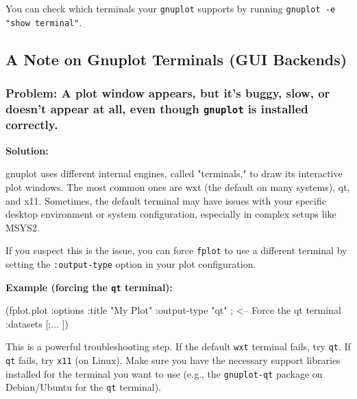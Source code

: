 \documentclass[12pt, letterpaper]{article}
\begin{document}
	You can check which terminals your \texttt{gnuplot} supports by running \texttt{gnuplot -e "show terminal"}.
	
	\subsection{A Note on Gnuplot Terminals (GUI Backends)}
	
	\subsubsection*{Problem: A plot window appears, but it's buggy, slow, or doesn't appear at all, even though \texttt{gnuplot} is installed correctly.}
	
	\textbf{Solution:}
	
	gnuplot uses different internal engines, called "terminals," to draw its interactive plot windows. The most common ones are wxt (the default on many systems), qt, and x11. Sometimes, the default terminal may have issues with your specific desktop environment or system configuration, especially in complex setups like MSYS2.
	
	If you suspect this is the issue, you can force \texttt{fplot} to use a different terminal by setting the \texttt{:output-type} option in your plot configuration.
	
	\textbf{Example (forcing the \texttt{qt} terminal):}
	
	\begin{fennelcode}
(fplot.plot
{:options {:title "My Plot"
		:output-type "qt"} ; <-- Force the qt terminal
	:datasets [;...
	]})
	\end{fennelcode}
	
	This is a powerful troubleshooting step. If the default \texttt{wxt} terminal fails, try \texttt{qt}. If \texttt{qt} fails, try \texttt{x11} (on Linux). Make sure you have the necessary support libraries installed for the terminal you want to use (e.g., the \texttt{gnuplot-qt} package on Debian/Ubuntu for the \texttt{qt} terminal).
	
	\printbibliography
\end{document}
